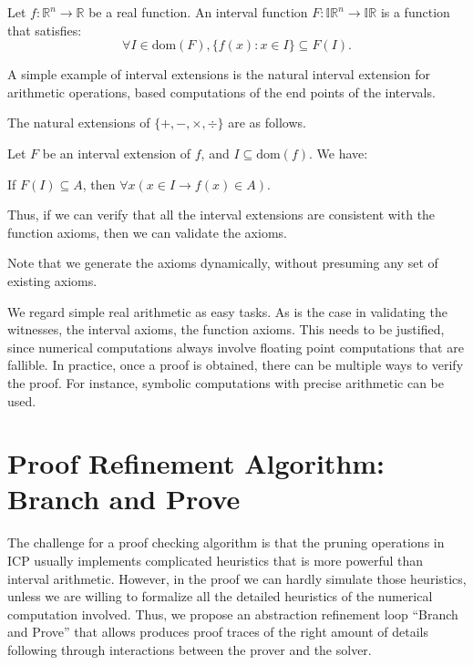 \documentclass[envcountsect]{llncs}
\newcommand{\dom}{\mathrm{dom}}
\begin{document}
\begin{definition}
Let $f: \mathbb{R}^n\rightarrow \mathbb{R}$ be a real function. An interval
function $F: \mathbb{IR}^n \rightarrow \mathbb{IR}$ is a function that
satisfies:
$$\forall I\in \dom(F), \{f(x): x\in I\}\subseteq F(I).$$
\end{definition}

A simple example of interval extensions is the natural interval extension for
arithmetic operations, based computations of the end points of the intervals.
\begin{example}
The natural extensions of $\{+, -, \times, \div\}$ are as follows.
\end{example}

\begin{proposition}
Let $F$ be an interval extension of $f$, and $I\subseteq \dom(f)$. We have:
\begin{center}
If $F(I)\subseteq A$, then $\forall x (x\in I \rightarrow f(x)\in A)$.
\end{center}
\end{proposition}
Thus, if we can verify that all the interval extensions are consistent with the
function axioms, then we can validate the axioms.

\begin{remark}
Note that we generate the axioms dynamically, without presuming any set of
existing axioms.  
\end{remark}

\begin{remark}
We regard simple real arithmetic as easy tasks.
As is the case in validating the witnesses, the interval axioms, the function
axioms. This needs to be justified, since numerical computations always involve
floating point computations that are fallible. In practice, once a proof is
obtained, there can be multiple ways to verify the proof. For instance, symbolic
computations with precise arithmetic can be used.
\end{remark}

\section{Proof Refinement Algorithm: Branch and Prove}

The challenge for a proof checking algorithm is that the pruning operations in
ICP usually implements complicated heuristics that is more powerful than
interval arithmetic. However, in the proof we can hardly simulate those
heuristics, unless we are willing to formalize all the detailed heuristics of
the numerical computation involved. Thus, we propose an abstraction refinement
loop ``Branch and Prove'' that allows produces proof traces of the right amount
of details following through interactions between the prover and the solver. 
\end{document}
